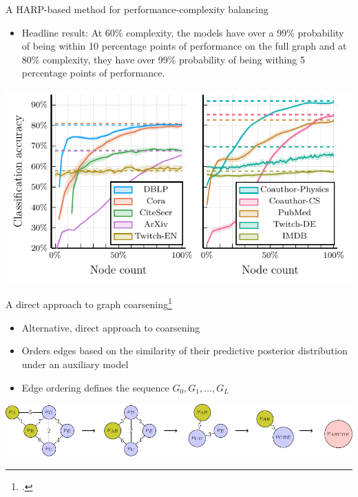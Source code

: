 \documentclass[10pt]{beamer}
\begin{document}
\begin{frame}{A HARP-based method for performance-complexity balancing}
	\begin{itemize}
		\item Headline result: At 60\% complexity, the models have over a 99\% probability of being within 10 percentage points of performance on the full graph and at 80\% complexity, they have over 99\% probability of being withing 5 percentage points of performance.
	\end{itemize}

	\vfill

	\centering
	\includegraphics[width=0.7\linewidth]{images/adaptive-coarsening/adaptive-coarsening.pdf}
\end{frame}

\begin{frame}{A direct approach to graph coarsening\footcite{prochazka_scalable_2022}}
	\begin{itemize}
		\item Alternative, direct approach to coarsening
		\item Orders edges based on the similarity of their predictive posterior distribution under an auxiliary model
		\item Edge ordering defines the sequence \( G_0, G_1, \dots, G_L \)
	\end{itemize}

	\vfill

	\centering
	\includegraphics[width=0.9\linewidth]{images/edge-contraction-sequence/edge-contraction-sequence.pdf}
\end{frame}
\end{document}
